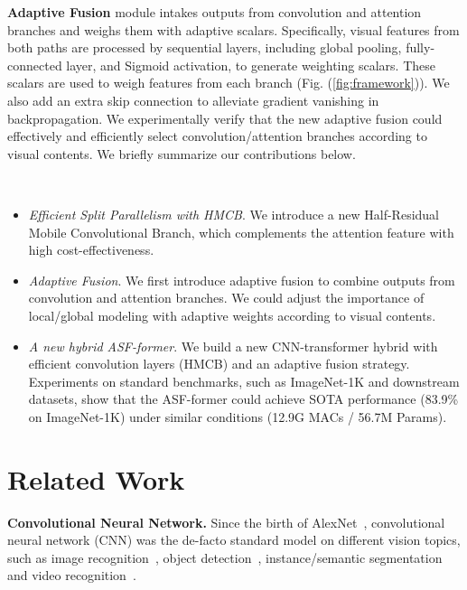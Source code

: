 \documentclass[lettersize,journal]{IEEEtran}
\begin{document}
\textbf{Adaptive Fusion} module intakes outputs from convolution and attention branches and weighs them with adaptive scalars. Specifically, visual features from both paths are processed by sequential layers, including global pooling, fully-connected layer, and Sigmoid activation, to generate weighting scalars. These scalars are used to weigh features from each branch (Fig. (\ref{fig:framework})). We also add an extra skip connection to alleviate gradient vanishing in backpropagation. We experimentally verify that the new adaptive fusion could effectively and efficiently select convolution/attention branches according to visual contents. We briefly summarize our contributions below.

\hspace*{\fill} \\

\begin{itemize}
    \item \textit{Efficient Split Parallelism with HMCB}. We introduce a new Half-Residual Mobile Convolutional Branch, which complements the attention feature with high cost-effectiveness. 
    \item \textit{Adaptive Fusion}. We first introduce adaptive fusion to combine outputs from convolution and attention branches. We could adjust the importance of local/global modeling with adaptive weights according to visual contents.
    \item \textit{A new hybrid ASF-former}. We build a new CNN-transformer hybrid with efficient convolution layers (HMCB) and an adaptive fusion strategy. Experiments on standard benchmarks, such as ImageNet-1K and downstream datasets, show that the ASF-former could achieve SOTA performance (83.9\% on ImageNet-1K) under similar conditions (12.9G MACs / 56.7M Params). 
\end{itemize}

\section{Related Work}

\textbf{Convolutional Neural Network.} Since the birth of AlexNet~\cite{Krizhevsky2012ImageNetCW}, convolutional neural network (CNN) was the de-facto standard model on different vision topics, such as image recognition~\cite{Simonyan2015VeryDC,Szegedy2015GoingDW,Szegedy2016RethinkingTI,He2016DeepRL,He2016IdentityMI,Huang2017DenselyCC}, object detection~\cite{Girshick2015FastR,Ren2015FasterRT,Redmon2016YouOL,Liu2016SSDSS,Lin2017FocalLF,Lin2017FeaturePN,Cai2018CascadeRD}, instance/semantic segmentation~\cite{He2017MaskR,Chen2017RethinkingAC,Chen2018DeepLabSI} and video recognition~\cite{Feichtenhofer2016ConvolutionalTN,Qiu2017LearningSR,Carreira2017QuoVA,Zhou2018TemporalRR,Wang2018NonlocalNN,Feichtenhofer2019SlowFastNF,Lin2019TSMTS}.
\end{document}
